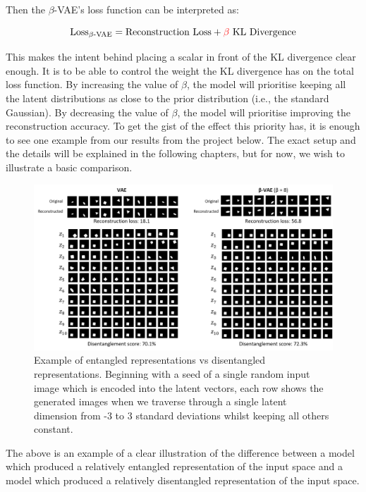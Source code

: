             Then the $\beta$-VAE's loss function can be interpreted as:
            
            \[ \text{Loss\textsubscript{$\beta$-VAE}} = \text{Reconstruction Loss} + \textcolor{red}{\beta} \text{ KL Divergence} \]
            
            This makes the intent behind placing a scalar in front of the KL divergence clear enough. It is to be able to control the weight the KL divergence has on the total loss function. By increasing the value of $\beta$, the model will prioritise keeping all the latent distributions as close to the prior distribution (i.e., the standard Gaussian). By decreasing the value of $\beta$, the model will prioritise improving the reconstruction accuracy. To get the gist of the effect this priority has, it is enough to see one example from our results from the project below. The exact setup and the details will be explained in the following chapters, but for now, we wish to illustrate a basic comparison.
            
            \begin{figure}[H]
                \centering
                \includegraphics[width=1\textwidth]{imgs/entangled_disentangled.png}
                \caption{Example of entangled representations vs disentangled representations. Beginning with a seed of a single random input image which is encoded into the latent vectors, each row shows the generated images when we traverse through a single latent dimension from -3 to 3 standard deviations whilst keeping all others constant.}
                \label{fig:entangled_disentangled}
            \end{figure}  
            
            The above is an example of a clear illustration of the difference between a model which produced a relatively entangled representation of the input space and a model which produced a relatively disentangled representation of the input space.
            
